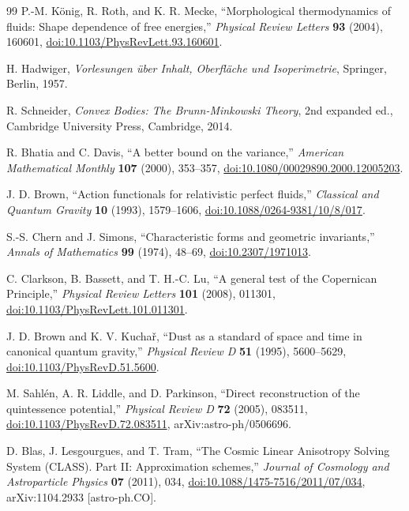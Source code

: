 \documentclass[11pt,a4paper]{article}
\numberwithin{equation}{section}
\theoremstyle{definition}
\theoremstyle{plain}
\theoremstyle{remark}
\begin{document}
\begin{thebibliography}{99}
P.-M. K\"onig, R. Roth, and K. R. Mecke, ``Morphological thermodynamics of fluids: Shape dependence of free energies,'' \emph{Physical Review Letters} \textbf{93} (2004), 160601, \href{https://doi.org/10.1103/PhysRevLett.93.160601}{doi:10.1103/PhysRevLett.93.160601}.

H. Hadwiger, \emph{Vorlesungen \"uber Inhalt, Oberfl\"ache und Isoperimetrie}, Springer, Berlin, 1957.

R. Schneider, \emph{Convex Bodies: The Brunn-Minkowski Theory}, 2nd expanded ed., Cambridge University Press, Cambridge, 2014.

R. Bhatia and C. Davis, ``A better bound on the variance,''
\emph{American Mathematical Monthly} \textbf{107} (2000), 353--357,
\href{https://doi.org/10.1080/00029890.2000.12005203}{doi:10.1080/00029890.2000.12005203}.

J. D. Brown, ``Action functionals for relativistic perfect fluids,'' \emph{Classical and Quantum Gravity} \textbf{10} (1993), 1579--1606, \href{https://doi.org/10.1088/0264-9381/10/8/017}{doi:10.1088/0264-9381/10/8/017}.

S.-S. Chern and J. Simons, ``Characteristic forms and geometric invariants,'' \emph{Annals of Mathematics} \textbf{99} (1974), 48--69, \href{https://doi.org/10.2307/1971013}{doi:10.2307/1971013}.

C. Clarkson, B. Bassett, and T. H.-C. Lu, ``A general test of the Copernican Principle,'' \emph{Physical Review Letters} \textbf{101} (2008), 011301, \href{https://doi.org/10.1103/PhysRevLett.101.011301}{doi:10.1103/PhysRevLett.101.011301}.

J. D. Brown and K. V. Kucha\v{r}, ``Dust as a standard of space and time in canonical quantum gravity,'' \emph{Physical Review D} \textbf{51} (1995), 5600--5629, \href{https://doi.org/10.1103/PhysRevD.51.5600}{doi:10.1103/PhysRevD.51.5600}.



M. Sahl\'en, A. R. Liddle, and D. Parkinson, ``Direct reconstruction of the quintessence potential,'' \emph{Physical Review D} \textbf{72} (2005), 083511, \href{https://doi.org/10.1103/PhysRevD.72.083511}{doi:10.1103/PhysRevD.72.083511}, arXiv:astro-ph/0506696.

D. Blas, J. Lesgourgues, and T. Tram, ``The Cosmic Linear Anisotropy Solving System (CLASS). Part II: Approximation schemes,'' \emph{Journal of Cosmology and Astroparticle Physics} \textbf{07} (2011), 034, \href{https://doi.org/10.1088/1475-7516/2011/07/034}{doi:10.1088/1475-7516/2011/07/034}, arXiv:1104.2933 [astro-ph.CO].


\end{thebibliography}
\end{document}
